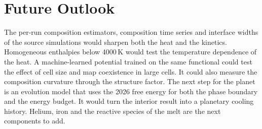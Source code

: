 \section{Future Outlook}

The per-run composition estimators, composition time series and interface widths of the source
simulations would sharpen both the heat and the kinetics. Homogeneous enthalpies below 4000\,K
would test the temperature dependence of the heat. A machine-learned potential trained on the
same functional could test the effect of cell size and map coexistence in large cells. It could
also measure the composition curvature through the structure factor. The next step for the
planet is an evolution model that uses the 2026 free energy for both the phase boundary and the
energy budget. It would turn the interior result into a planetary cooling history. Helium, iron and the reactive species of the melt are the next
components to add.
